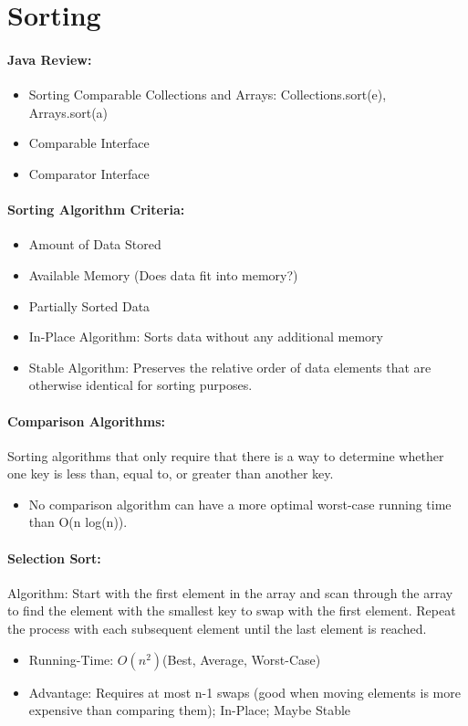 \documentclass[12pt]{article}
\begin{document}
\section{Sorting}

\paragraph{Java Review:}
\begin{itemize}
	\item Sorting Comparable Collections and Arrays: Collections.sort(e), Arrays.sort(a)
	\item Comparable Interface
	\item Comparator Interface
\end{itemize}

\paragraph{Sorting Algorithm Criteria:}
\begin{itemize}
	\item Amount of Data Stored
	\item Available Memory (Does data fit into memory?)
	\item Partially Sorted Data
	\item In-Place Algorithm: Sorts data without any additional memory
	\item Stable Algorithm: Preserves the relative order of data elements that are otherwise identical for sorting purposes.
\end{itemize}

\paragraph{Comparison Algorithms:} Sorting algorithms that only require that there is a way to determine whether one key is less than, equal to, or greater than another key.
\begin{itemize}
	\item No comparison algorithm can have a more optimal worst-case running time than O(n log(n)).
\end{itemize}

\paragraph{Selection Sort:}
Algorithm: Start with the first element in the array and scan through the array to find the element with the smallest key to swap with the first element. Repeat the process with each subsequent element until the last element is reached.
\begin{itemize}
	\item Running-Time: \(O(n^2) \)(Best, Average, Worst-Case)
	\item Advantage: Requires at most n-1 swaps (good when moving elements is more expensive than comparing them); In-Place; Maybe Stable
\end{itemize}
\end{document}
